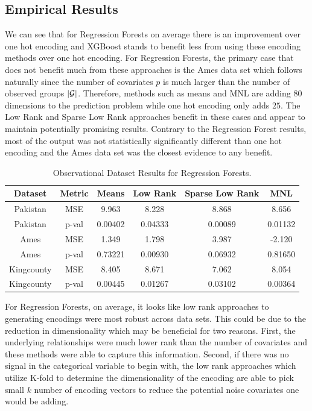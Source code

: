 \documentclass{article}
\theoremstyle{plain}
\theoremstyle{definition}
\theoremstyle{remark}
\begin{document}

\subsection{Empirical Results}


We can see that for Regression Forests on average there is an improvement over one hot encoding and XGBoost stands to benefit less from using these encoding methods over one hot encoding. For Regression Forests, the primary case that does not benefit much from these approaches is the Ames data set which follows naturally since the number of covariates $p$ is much larger than the number of observed groups $|\mathcal{G}|$. Therefore, methods such as means and MNL are adding $80$ dimensions to the prediction problem while one hot encoding only adds $25$. The Low Rank and Sparse Low Rank approaches benefit in these cases and appear to maintain potentially promising results. Contrary to the Regression Forest results, most of the output was not statistically significantly different than one hot encoding and the Ames data set was the closest evidence to any benefit.

\begin{table}[H]
	\centering
	\begin{tabular}{|c|c|c|c|c|c|}
		\hline
		Dataset& Metric & Means & Low Rank & Sparse Low Rank & MNL  \\
		\hline
		Pakistan & MSE & 9.963 &8.228 &8.868 &8.656 \\
		Pakistan & p-val& 0.00402 & 0.04333&0.00089 &0.01132 \\
		\hline
		Ames & MSE & 1.349 & 1.798&3.987 &-2.120\\
		Ames & p-val&0.73221&0.00930&0.06932&0.81650 \\
		\hline
		Kingcounty & MSE &8.405&8.671&7.062& 8.054\\
		Kingcounty & p-val&0.00445&0.01267&0.03102&0.00364 \\
		\hline
	\end{tabular}
	\caption{Observational Dataset Results for Regression Forests.}
	\label{tab:observational_rf}
\end{table}
For Regression Forests, on average, it looks like low rank approaches to generating encodings were most robust across data sets. This could be due to the reduction in dimensionality which may be beneficial  for two reasons. First, the underlying relationships were much lower rank than the number of covariates and these methods were able to capture this information. Second, if there was no signal in the categorical variable to begin with, the low rank approaches which utilize K-fold to determine the dimensionality of the encoding are able to pick small $k$ number of encoding vectors to reduce the potential noise covariates one would be adding.
\end{document}

